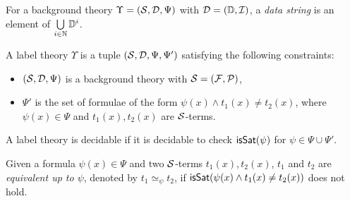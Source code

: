 For a background theory $\Upsilon=(\mathcal{S}, \mathcal{D}, \Psi)$ with $\mathcal{D} = (\mathbb{D}, \mathcal{I})$, a \emph{data string} is an element of $\bigcup \limits_{i \in \mathbb{N}} \mathbb{D}^i$.


\begin{definition}
A label theory  $\Upsilon$ is a tuple $(\mathcal{S}, \mathcal{D}, \Psi, \Psi')$ satisfying the following constraints:
\begin{itemize}
\item $(\mathcal{S}, \mathcal{D}, \Psi)$ is a background theory with $\mathcal{S} = ({\mathcal{F}}, {\mathcal{P}})$,
%
\item $\Psi'$ is the set of formulae of the form $\psi(x) \wedge t_1(x) \neq t_2(x)$, where $\psi(x) \in \Psi$ and $t_1(x), t_2(x)$ are $\mathcal{S}$-terms.
\end{itemize}
A label theory is decidable if it is decidable to check $\mathsf{isSat}(\psi)$ for $\psi \in \Psi \cup \Psi'$.
\end{definition}

Given a formula $\psi(x) \in \Psi$ and two $\mathcal{S}$-terms $t_1(x), t_2(x)$,
$t_1$ and $t_2$ are \emph{equivalent up to $\psi$}, denoted by $t_1 \simeq_\psi t_2$, if
 $\mathsf{isSat}(\psi(x) \wedge t_1(x) \neq t_2(x))$ does not hold.


